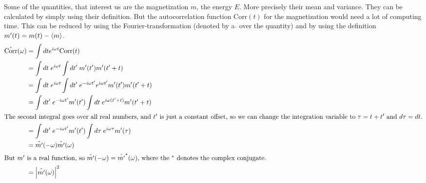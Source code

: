Some of the quantities, that interest us are the magnetization $m$, the energy $E$. More precisely their mean and variance. They can be calculated by simply using their definition. But the autocorrelation function Corr$(t)$ for the magnetization would need a lot of computing time. This can be reduced by using the Fourier-transformation (denoted by a $\hat{}$ over the quantity) and by using the definition $m'(t) = m(t) - \left\langle m\right\rangle$.
\begin{align}
  \hat{\text{Corr}}(\omega) & = \int dt e^{i \omega t} \text{Corr}(t) \\
  & = \int dt \; e^{i \omega t} \int dt'\; m'(t') m'(t'+t) \\
  & = \int dt\; e^{i \omega t} \int dt'\; e^{-i \omega t'} e^{i \omega t'} m'(t') m'(t'+t) \\
  & = \int dt'\; e^{-i \omega t'} m'(t') \int dt\; e^{i \omega (t' + t)} m'(t'+t) \\
  \intertext{The second integral goes over all real numbers, and $t'$ is just a constant offset, so we can change the integration variable to $\tau = t + t'$ and $d \tau = dt$.}
  & = \int dt'\; e^{-i \omega t'} m'(t') \int d\tau \; e^{i \omega \tau} m'(\tau) \\
  & = \hat{m'}(- \omega) \hat{m'}(\omega) \\
  \intertext{But $m'$ is a real function, so $\hat{m'}(- \omega) = \hat{m'}^*( \omega)$, where the $^*$ denotes the complex conjugate.}
  & = \left\vert\hat{m'}(\omega) \right\vert^2
\end{align}
